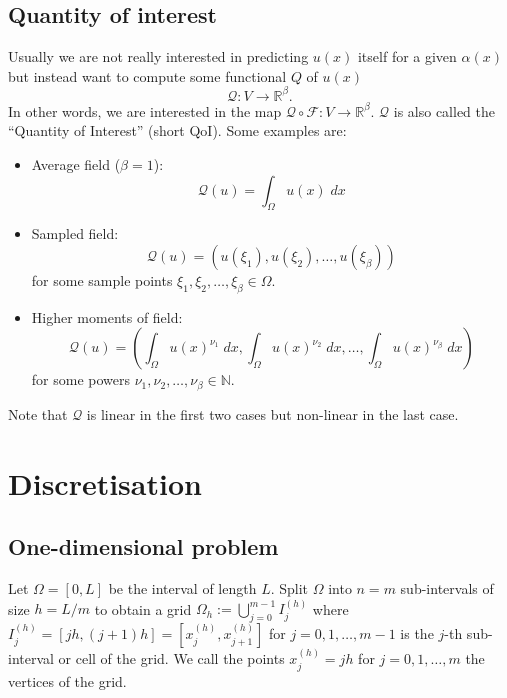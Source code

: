 \documentclass[11pt]{article}
\begin{document}
\subsection{Quantity of interest}
Usually we are not really interested in predicting $u(x)$ itself for a given $\alpha(x)$ but instead want to compute some functional $Q$ of $u(x)$
\begin{equation}
    \mathcal{Q}: V\rightarrow \mathbb{R}^\beta.\label{eqn:QoI}
\end{equation}
In other words, we are interested in the map $\mathcal{Q}\circ \mathcal{F}:V\rightarrow \mathbb{R}^\beta$. $\mathcal{Q}$ is also called the ``Quantity of Interest'' (short QoI). Some examples are:
\begin{itemize}
    \item Average field ($\beta=1$):
    \begin{equation}
        \mathcal{Q}(u) = \int_\Omega u(x)\;dx
    \end{equation}
    \item Sampled field:
    \begin{equation}
        \mathcal{Q}(u) = (u(\xi_1),u(\xi_2),\dots,u(\xi_\beta))
    \end{equation}
     for some sample points $\xi_1,\xi_2,\dots,\xi_\beta\in\Omega$.
    \item Higher moments of field:
    \begin{equation}
        \mathcal{Q}(u) = \left(\int_\Omega u(x)^{\nu_1}\;dx,\int_\Omega u(x)^{\nu_2}\;dx,\dots,\int_\Omega u(x)^{\nu_\beta}\;dx\right)
    \end{equation}
    for some powers $\nu_1,\nu_2,\dots,\nu_\beta\in\mathbb{N}$.
\end{itemize}
Note that $\mathcal{Q}$ is linear in the first two cases but non-linear in the last case.
\section{Discretisation}
\subsection{One-dimensional problem}
Let $\Omega = [0,L]$ be the interval of length $L$. Split $\Omega$ into $n=m$ sub-intervals of size $h=L/m$ to obtain a grid \mbox{$\Omega_h := \bigcup_{j=0}^{m-1} I_j^{(h)}$} where $I_j^{(h)}=[jh,(j+1)h]=[x^{(h)}_j,x^{(h)}_{j+1}]$ for $j=0,1,\dots,m-1$ is the $j$-th sub-interval or cell of the grid. We call the points $x^{(h)}_j=jh$ for $j=0,1,\dots,m$ the vertices of the grid.
\end{document}
